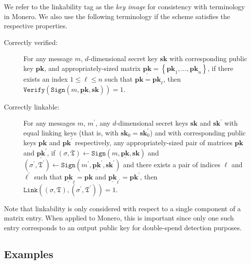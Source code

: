 \documentclass{mrl}
\theoremstyle{plain}
\theoremstyle{definition}
\begin{document}
We refer to the linkability tag as the \textit{key image} for consistency with terminology in Monero. We also use the following terminology if the scheme satisfies the respective properties.
\begin{description}
\item[Correctly verified:] For any message $m$, $d$-dimensional secret key $\textbf{sk}$ with corresponding public key $\textbf{pk}$, and appropriately-sized matrix $\underline{\textbf{pk}} = \left\{\textbf{pk}_1, \ldots, \textbf{pk}_n\right\}$, if there exists an index $1 \leq \ell \leq n$ such that $\textbf{pk} = \textbf{pk}_\ell$, then $\texttt{Verify}(\texttt{Sign}(m, \underline{\textbf{pk}}, \textbf{sk})) = 1$.

\item[Correctly linkable:] For any messages $m$, $m^\prime$, any $d$-dimensional secret keys  $\textbf{sk}$ and $\textbf{sk}^\prime$ with equal linking keys (that is, with $\textbf{sk}_0 = \textbf{sk}^\prime_0$) and with corresponding public keys $\textbf{pk}$ and $\textbf{pk}^\prime$ respectively, any appropriately-sized pair of matrices $\underline{\textbf{pk}}$ and $\underline{\textbf{pk}}^\prime$, if $(\sigma, \mathfrak{T}) \leftarrow \texttt{Sign}(m, \underline{\textbf{pk}}, \textbf{sk})$ and $(\sigma^\prime, \mathfrak{T}^\prime) \leftarrow \texttt{Sign}(m^\prime, \underline{\textbf{pk}}^\prime, \textbf{sk}^\prime)$ and there exists a pair of indices $\ell$ and $\ell^\prime$ such that $\underline{\textbf{pk}}_\ell = \textbf{pk}$ and $\underline{\textbf{pk}}_{\ell^\prime} = \textbf{pk}^\prime$, then
$\texttt{Link}((\sigma, \mathfrak{T}), (\sigma^\prime, \mathfrak{T}^\prime))=1$.
\end{description}

Note that linkability is only considered with respect to a single component of a matrix entry. When applied to Monero, this is important since only one such entry corresponds to an output public key for double-spend detection purposes.



\subsection{Examples}
\end{document}
